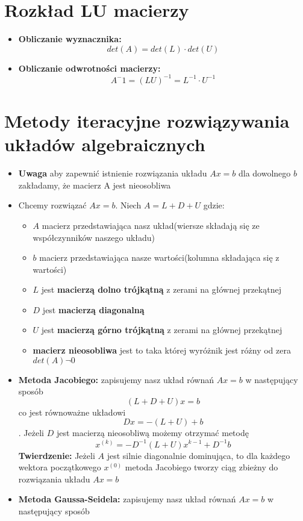 \documentclass[11pt]{article}
\begin{document}
\section{Rozkład LU macierzy}
\begin{itemize}
    \item \textbf{Obliczanie wyznacznika: } \[det(A) = det(L) \cdot det(U)\]
    \item \textbf{Obliczanie odwrotności macierzy: }\[A^-1 = (LU)^{-1} = L^{-1} \cdot U^{-1}\]
\end{itemize}

\section{Metody iteracyjne rozwiązywania układów algebraicznych}
\begin{itemize}
    \item \textbf{Uwaga }aby zapewnić istnienie rozwiązania układu $Ax = b$ dla dowolnego $b$ zakładamy, że macierz A jest nieosobliwa 
    \item Chcemy rozwiązać $Ax = b$. Niech $A = L + D + U$ gdzie:
    \begin{itemize}
        \item $A$ macierz przedstawiająca nasz układ(wiersze składają się ze współczynników naszego układu)
        \item $b$ macierz przedstawiająca nasze wartości(kolumna składająca się z wartości)
        \item $L$ jest \textbf{macierzą dolno trójkątną} z zerami na głównej przekątnej
        \item $D$ jest \textbf{macierzą diagonalną}
        \item $U$ jest \textbf{macierzą górno trójkątną} z zerami na głównej przekątnej
        \item \textbf{macierz nieosobliwa} jest to taka której wyróżnik jest różny od zera $det(A) \neg 0$
    \end{itemize}
    \item \textbf{Metoda Jacobiego: }zapisujemy nasz układ równań $Ax = b$ w następujący sposób
    \[(L + D + U)x = b\]
    co jest równoważne układowi
    \[Dx = -(L+U) + b\].
    Jeżeli $D$ jest macierzą nieosobliwą możemy otrzymać metodę
    \[x^{(k)} = -D^{-1}(L+U)x^{k-1} + D^{-1}b\]
    \textbf{Twierdzenie: }Jeżeli $A$ jest silnie diagonalnie dominująca, to dla każdego wektora początkowego $x^{(0)}$ metoda Jacobiego tworzy ciąg zbieżny do rozwiązania układu $Ax = b$
    \item \textbf{Metoda Gaussa-Seidela: }zapisujemy nasz układ równań $Ax = b$ w następujący sposób

\end{itemize}
\end{document}
